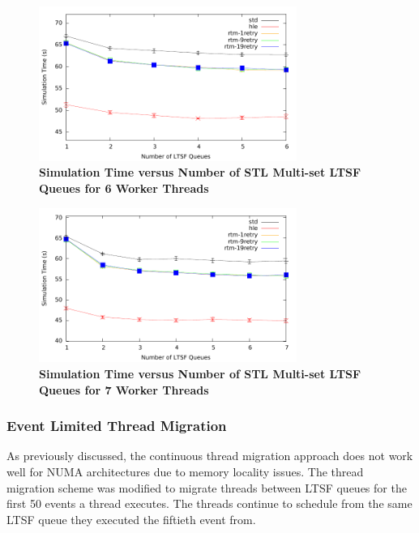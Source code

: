 \documentclass[11pt]{book}
\begin{document}
\begin{figure}[H]
    \centering
    \graphicspath{ {./figures/} }
    \includegraphics[width=0.75\textwidth,keepaspectratio]{hugeepidemicsim-CONTmig-timeVSschedQs-multiset-6thread}
    \caption{\textbf{Simulation Time versus Number of STL Multi-set LTSF Queues
    for 6 Worker Threads}}
    \label{fig:contThrMig_timeVSschq_6threads}
\end{figure}

\begin{figure}[H]
    \centering
    \graphicspath{ {./figures/} }
    \includegraphics[width=0.75\textwidth,keepaspectratio]{hugeepidemicsim-CONTmig-timeVSschedQs-multiset-7thread}
    \caption{\textbf{Simulation Time versus Number of STL Multi-set LTSF Queues
    for 7 Worker Threads}}
    \label{fig:contThrMig_timeVSschq_7threads}
\end{figure}

\subsubsection{Event Limited Thread Migration}

As previously discussed, the continuous thread migration approach does not work
well for NUMA architectures due to memory locality issues.  The thread migration
scheme was modified to migrate threads between LTSF queues for the first 50
events a thread executes.  The threads continue to schedule from the same LTSF
queue they executed the fiftieth event from.  
\end{document}
